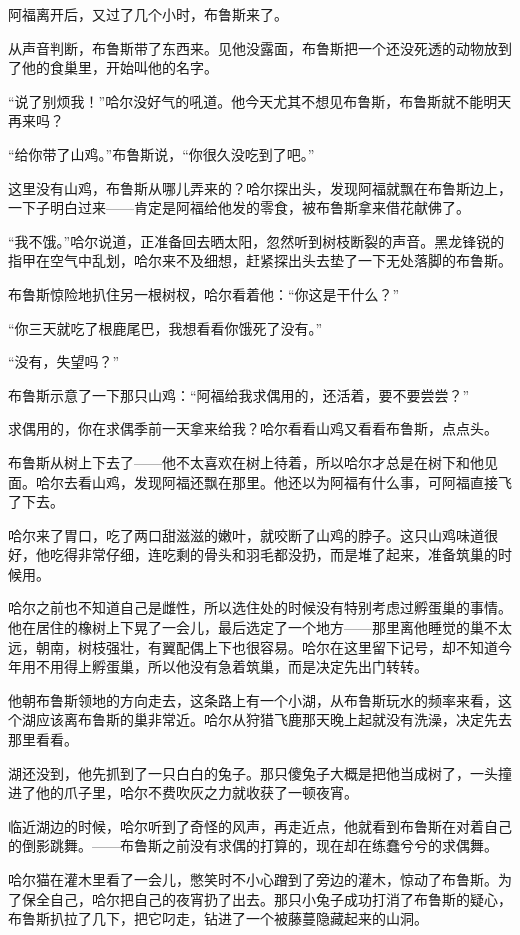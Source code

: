 \documentclass[../main.tex]{subfiles}
\begin{document}
阿福离开后，又过了几个小时，布鲁斯来了。

从声音判断，布鲁斯带了东西来。见他没露面，布鲁斯把一个还没死透的动物放到了他的食巢里，开始叫他的名字。

“说了别烦我！”哈尔没好气的吼道。他今天尤其不想见布鲁斯，布鲁斯就不能明天再来吗？

“给你带了山鸡。”布鲁斯说，“你很久没吃到了吧。”

这里没有山鸡，布鲁斯从哪儿弄来的？哈尔探出头，发现阿福就飘在布鲁斯边上，一下子明白过来——肯定是阿福给他发的零食，被布鲁斯拿来借花献佛了。

“我不饿。”哈尔说道，正准备回去晒太阳，忽然听到树枝断裂的声音。黑龙锋锐的指甲在空气中乱划，哈尔来不及细想，赶紧探出头去垫了一下无处落脚的布鲁斯。

布鲁斯惊险地扒住另一根树杈，哈尔看着他：“你这是干什么？”

“你三天就吃了根鹿尾巴，我想看看你饿死了没有。”

“没有，失望吗？”

布鲁斯示意了一下那只山鸡：“阿福给我求偶用的，还活着，要不要尝尝？”

求偶用的，你在求偶季前一天拿来给我？哈尔看看山鸡又看看布鲁斯，点点头。

布鲁斯从树上下去了——他不太喜欢在树上待着，所以哈尔才总是在树下和他见面。哈尔去看山鸡，发现阿福还飘在那里。他还以为阿福有什么事，可阿福直接飞了下去。

哈尔来了胃口，吃了两口甜滋滋的嫩叶，就咬断了山鸡的脖子。这只山鸡味道很好，他吃得非常仔细，连吃剩的骨头和羽毛都没扔，而是堆了起来，准备筑巢的时候用。

哈尔之前也不知道自己是雌性，所以选住处的时候没有特别考虑过孵蛋巢的事情。他在居住的橡树上下晃了一会儿，最后选定了一个地方——那里离他睡觉的巢不太远，朝南，树枝强壮，有翼配偶上下也很容易。哈尔在这里留下记号，却不知道今年用不用得上孵蛋巢，所以他没有急着筑巢，而是决定先出门转转。

他朝布鲁斯领地的方向走去，这条路上有一个小湖，从布鲁斯玩水的频率来看，这个湖应该离布鲁斯的巢非常近。哈尔从狩猎飞鹿那天晚上起就没有洗澡，决定先去那里看看。

湖还没到，他先抓到了一只白白的兔子。那只傻兔子大概是把他当成树了，一头撞进了他的爪子里，哈尔不费吹灰之力就收获了一顿夜宵。

临近湖边的时候，哈尔听到了奇怪的风声，再走近点，他就看到布鲁斯在对着自己的倒影跳舞。——布鲁斯之前没有求偶的打算的，现在却在练蠢兮兮的求偶舞。

哈尔猫在灌木里看了一会儿，憋笑时不小心蹭到了旁边的灌木，惊动了布鲁斯。为了保全自己，哈尔把自己的夜宵扔了出去。那只小兔子成功打消了布鲁斯的疑心，布鲁斯扒拉了几下，把它叼走，钻进了一个被藤蔓隐藏起来的山洞。
\end{document}

